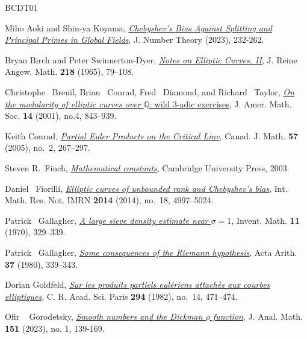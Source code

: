 \documentclass[12pt,reqno]{amsart}
\theoremstyle{definition}
\numberwithin{equation}{section}
\begin{document}
\begin{thebibliography}{BCDT01}

Miho Aoki and Shin-ya Koyama, \emph{\href{https://doi.org/10.1016/j.jnt.2022.10.005}{Chebyshev's Bias
  Against Splitting and Principal Primes in Global Fields}},  J. Number Theory (2023), 232-262. 
  
Bryan Birch and Peter Swinnerton-Dyer, \emph{\href{https://doi.org/10.1515/crll.1965.218.79}{Notes on Elliptic
  Curves. {II}}}, J. Reine Angew. Math. \textbf{218} (1965), 79--108.

Christophe ~Breuil, Brian ~Conrad, Fred ~Diamond, and Richard ~Taylor, \href{https://www.ams.org/journals/jams/2001-14-04/S0894-0347-01-00370-8/}{\emph{On the modularity of elliptic curves over $\mathbb Q$}:
wild 3-adic exercises}, J. Amer. Math. Soc. \textbf{14} (2001), no.4, 843–939.


Keith Conrad, \emph{\href{https://doi.org/10.4153/CJM-2005-012-6}{Partial
  {E}uler Products on the Critical Line}}, Canad. J. Math.
  \textbf{57} (2005), no.~2, 267--297.

Steven R.~Finch, 
\href{}{\emph{Mathematical constants}}, Cambridge University Press, 2003. 

Daniel ~Fiorilli, \href{https://academic.oup.com/imrn/article-abstract/2014/18/4997/747462}{\emph{Elliptic curves of unbounded rank and {C}hebyshev's bias}},
  Int. Math. Res. Not. IMRN \textbf{2014} (2014), no.~18, 4997--5024.  
  

Patrick ~Gallagher, \href{https://link.springer.com/article/10.1007/BF01403187}{\emph{A large sieve density estimate near $\sigma=1$}}, Invent. Math. \textbf{11} (1970), 329--339.

Patrick ~Gallagher, \href{http://matwbn.icm.edu.pl/ksiazki/aa/aa37/aa37130.pdf}{ 
\emph{Some consequences of the Riemann hypothesis}}, Acta Arith. \textbf{37} (1980),
339–343.

Dorian Goldfeld,
  \emph{\href{https://gallica.bnf.fr/ark:/12148/bpt6k55329490/f15.image.r=Sur\%20les\%20produits\%20euleriens}{Sur
  les produits partiels eul\'{e}riens attach\'{e}s aux courbes elliptiques}},
   C. R. Acad. Sci. Paris
  \textbf{294} (1982), no.~14, 471--474. 


Ofir ~ Gorodetsky, \href{https://link.springer.com/article/10.1007/s11854-023-0328-6}{\emph{Smooth numbers and the Dickman $\rho$ function}}, J. Anal. Math. \textbf{151} (2023), no. 1, 139-169. 


\end{thebibliography}
\end{document}
